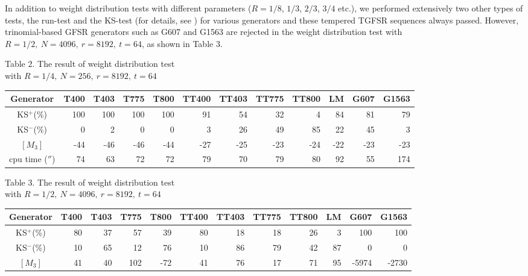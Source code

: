 In addition to weight distribution tests with different parameters
($R=1/8$, $1/3$, $2/3$, $3/4$ etc.), 
we performed extensively two other types of tests, 
the run-test and the KS-test 
(for details, see \cite{matsumoto}) for various generators 
and these tempered TGFSR sequences always passed.
However, trinomial-based GFSR generators such as G607 and G1563 are rejected 
in the weight distribution test with $R=1/2,\ N=4096,\ r=8192,\  t=64$, 
as shown in Table 3.

\vspace{1.5cm}
\begin{center}

Table 2. The result of weight distribution test \\
with $R=1/4,\ N=256,\ r=8192,\ t=64 $ \\


{\footnotesize
\begin{tabular}{|c|r|r|r|r|r|r|r|r|r|r|r|} \hline \hline 
Generator & T400 & T403 & T775 & T800 & TT400 & TT403 & TT775 & TT800 
& LM & G607 & G1563 \\
\hline
KS$^+$(\%)  &100 & 100 & 100 & 100 & 91 & 54 & 32 &  4 & 84 & 81 & 79 \\
\hline 
KS$^-$(\%)  &  0 &   2 &   0 &   0 &  3 & 26 & 49 & 85 & 22 & 45 &  3 \\
\hline 
$[M_3]$ &-44 & -46 & -46 & -44 &-27 &-25 &-23 &-24 &-22 &-23 &-23 \\
\hline 
cpu time ($''$)
       & 74 &  63 &  72 &  72 & 79 & 70 & 79 & 80 & 92 & 55 &174 \\
\hline 
\end{tabular}
}

\vspace{15mm}

Table 3. The result of weight distribution test\\
with $R=1/2,\ N=4096,\ r=8192,\ t=64 $ \\

{\footnotesize
\begin{tabular}{|c|r|r|r|r|r|r|r|r|r|r|r|} \hline \hline 
Generator & T400 & T403 & T775 & T800 & TT400 & TT403 & TT775 & TT800 
& LM & G607 & G1563 \\ 
\hline
KS$^+$(\%)  & 80 & 37 & 57  &  39 & 80 & 18 & 18 & 26 &  3 &   100 &   100 \\
\hline 
KS$^-$(\%)  & 10 & 65 & 12  &  76 & 10 & 86 & 79 & 42 & 87 &     0 &     0 \\
\hline 
$[M_3]$ & 41 & 40 & 102 & -72 & 41 & 76 & 17 & 71 & 95 & -5974 & -2730 \\
\hline 
\end{tabular}
}
\end{center}

